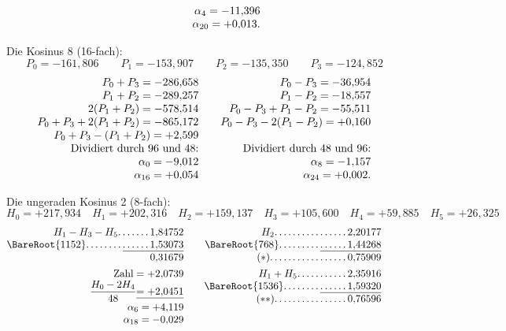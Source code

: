 \begin{landscape}
\[\begin{array}{@{}r@{\qquad}r@{\qquad}r@{}}
&&\alpha_4=-11{,}396\\
&&\alpha_{20}=+0{,}013.
\end{array}
\]
\par\noindent\hspace*{\parindent}Die Kosinus 8 (16-fach):
\[P_0=-161{,}806\qquad P_1=-153{,}907\qquad P_2=-135{,}350\qquad P_3=-124{,}852\]
\[
\begin{array}{@{}r@{\qquad}r@{}}
P_0+P_3=-286{,}658&P_0-P_3=-36{,}954\\
P_1+P_2=-289{,}257&P_1-P_2=-18{,}557\\
2(P_1+P_2)=-578{,}514&P_0-P_3+P_1-P_2=-55{,}511\\
P_0+P_3+2(P_1+P_2)=-865{,}172&P_0-P_3-2(P_1-P_2)=+0{,}160\\
P_0+P_3-(P_1+P_2)=+2{,}599&\\
\text{Dividiert durch 96 und 48:}&\text{Dividiert durch 48 und 96:}\\
\alpha_0=-9{,}012&\alpha_8=-1{,}157\\
\alpha_{16}=+0{,}054&\alpha_{24}=+0{,}002.
\end{array}
\]
\par\noindent\hspace*{\parindent}Die ungeraden Kosinus 2 (8-fach):
\[H_0=+217{,}934\quad H_1=+202{,}316\quad H_2=+159{,}137\quad H_3=+105{,}600\quad H_4=+59{,}885\quad H_5=+26{,}325\]
\[
\begin{array}{@{}r@{\qquad}r@{\qquad}r@{}}
\begin{array}[t]{@{}r@{}}
H_1-H_3-H_5\VfourDots{6}1{,}84752\\
\BareRoot{1152}\VfourDots{7}\underline{\VfourDots{5}1{,}53073}\\
0{,}31679\\[4pt]
\text{Zahl}=+2{,}0739\\
\dfrac{H_0-2H_4}{48}\underline{=+2{,}0451}\\
\alpha_6=+4{,}119\\
\alpha_{18}=-0{,}029
\end{array}
&\begin{array}[t]{@{}r@{}}
H_2\VfourDots{15}2{,}20177\\
\BareRoot{768}\VfourDots{8}\underline{\VfourDots{5}1{,}44268}\\
(*)\VfourDots{16}0{,}75909\\[4pt]
H_1+H_5\VfourDots{10}2{,}35916\\
\BareRoot{1536}\VfourDots{7}\underline{\VfourDots{5}1{,}59320}\\
(**)\VfourDots{15}0{,}76596\\[4pt]

\end{array}
\end{array}\]
\end{landscape}
